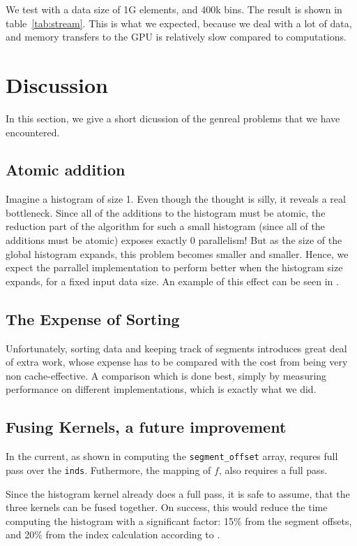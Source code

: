 \documentclass[12pt, a4paper, hidelinks]{article}
\renewcommand{\tt}[1]{\texttt{#1}}
\begin{document}
We test with a data size of 1G elements, and 400k bins. The result is shown in table~\ref{tab:stream}.
This is what we expected, because we deal with a lot of data, and memory transfers to the GPU is
relatively slow compared to computations.

\section{Discussion}
In this section, we give a short dicussion of the genreal problems that we have encountered.

\subsection{Atomic addition}
Imagine a histogram of size 1. Even though the thought is silly,
it reveals a real bottleneck. Since all of the additions to the
histogram must be atomic, the reduction part of the algorithm for
such a small histogram (since all of the additions must be atomic)
exposes exactly 0 parallelism! But as the size of the global histogram
expands, this problem becomes smaller and smaller.
Hence, we expect the parrallel implementation to perform better when the
histogram size expands, for a fixed input data size.
An example of this effect can be seen in .

\subsection{The Expense of Sorting}
Unfortunately, sorting data and keeping track of segments
introduces great deal of extra work, whose expense has to be compared
with the cost from being very non cache-effective.
A comparison which is done best, simply by measuring performance on
different implementations, which is exactly what we did.

\subsection{Fusing Kernels, a future improvement}
In the current, as shown in  computing the \tt{segment\_offset} array,
requres full pass over the \tt{inds}. Futhermore, the mapping of $f$, also requires a full pass.

Since the histogram kernel already does a full pass,
it is safe to assume, that the three kernels can be fused together.
On success, this would reduce the time computing the histogram with a
significant factor: 15\% from the segment offsets, and 20\% from the index calculation according to
.
\end{document}
